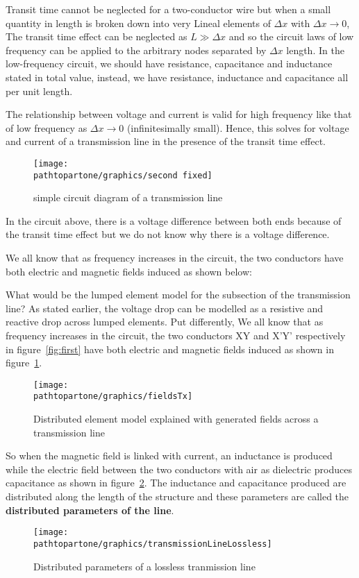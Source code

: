 Transit time cannot be neglected for a two-conductor wire but when a small quantity in length is broken down into very Lineal elements of $ \Delta x $ with  $  \Delta x \rightarrow 0 $, The transit time effect can be neglected as $ L \gg \Delta x $ and so the circuit laws of low frequency can be applied to the arbitrary nodes separated by $ \Delta x $ length. In the low-frequency circuit, we should have resistance, capacitance and inductance stated in total value, instead, we have resistance, inductance and capacitance all per unit length.

The relationship between voltage and current is valid for high frequency like that of low frequency as $ \Delta x  \rightarrow 0$ (infinitesimally small). Hence, this solves for voltage and current of a transmission line in the presence of the transit time effect.
\begin{figure}[h]
\centering
\texttt{[image: \\pathtopartone/graphics/second fixed]}
\caption{simple circuit diagram of a transmission line}
\end{figure}	

In the circuit above, there is a voltage difference between both ends because of the transit time effect but we do not know why there is a voltage difference.

We all know that as frequency increases in the circuit, the two conductors have both electric and magnetic fields induced as shown below: 

What would be the lumped element model for the subsection of the transmission line? As stated earlier, the voltage drop can be modelled as a resistive and reactive drop across lumped elements. Put differently, We all know that as frequency increases in the circuit, the two conductors XY and X'Y' respectively in figure~\ref{fig:first} have both electric and magnetic fields induced as shown in figure~\ref{fig:third}.
\begin{figure}[h]
\centering
\texttt{[image: \\pathtopartone/graphics/fieldsTx]}
\caption{Distributed element model explained with generated fields across a transmission line}
\label{fig:third}
\end{figure}

So when the magnetic field is linked with current, an inductance is produced while the electric field between the two conductors with air as dielectric produces capacitance as shown in figure~\ref{fig:lossless-Tx}. The inductance and capacitance produced are distributed along the length of the structure and these parameters are called the \textbf{distributed parameters of the line}.
\begin{figure}[h]
\centering
\texttt{[image: \\pathtopartone/graphics/transmissionLineLossless]}
\caption{Distributed parameters of a lossless tranmission line}
\label{fig:lossless-Tx}
\end{figure}

